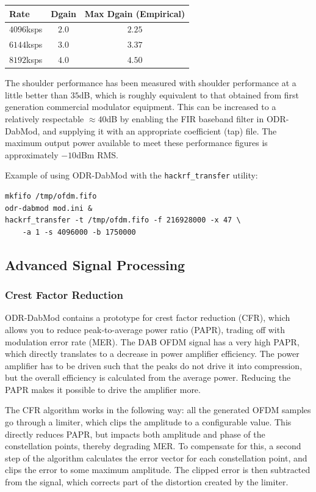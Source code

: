 \begin{center}
\begin{tabular}{| l | c | c |}
    \hline
    Rate       & Dgain & Max Dgain (Empirical) \\ \hline \hline
    $4096$ksps & $2.0$ & $2.25$ \\ \hline
    $6144$ksps & $3.0$ & $3.37$ \\ \hline
    $8192$ksps & $4.0$ & $4.50$ \\
    \hline
\end{tabular}
\end{center}

The shoulder performance has been measured with shoulder performance at a little
better than $35$dB, which is roughly equivalent to that obtained from first
generation commercial modulator equipment. This can be increased to a relatively
respectable $\approx 40$dB by enabling the FIR baseband filter in ODR-DabMod,
and supplying it with an appropriate coefficient (tap) file. The maximum output
power available to meet these performance figures is approximately $-10$dBm RMS.

Example of using ODR-DabMod with the \texttt{hackrf\_transfer} utility:

\begin{lstlisting}
mkfifo /tmp/ofdm.fifo
odr-dabmod mod.ini &
hackrf_transfer -t /tmp/ofdm.fifo -f 216928000 -x 47 \
    -a 1 -s 4096000 -b 1750000
\end{lstlisting}


\subsection{Advanced Signal Processing}
\subsubsection{Crest Factor Reduction}
ODR-DabMod contains a prototype for crest factor reduction (CFR), which allows you to
reduce peak-to-average power ratio (PAPR), trading off with modulation error
rate (MER). The DAB OFDM signal has a very high PAPR, which directly translates
to a decrease in power amplifier efficiency. The power amplifier has to be
driven such that the peaks do not drive it into compression, but the overall
efficiency is calculated from the average power.
Reducing the PAPR makes it possible to drive the amplifier more.

The CFR algorithm works in the following way: all the generated OFDM samples go
through a limiter, which clips the amplitude to a configurable value. This
directly reduces PAPR, but impacts both amplitude and phase of the constellation
points, thereby degrading MER. To compensate for this, a second step of the
algorithm calculates the error vector for each constellation point, and clips
the error to some maximum amplitude. The clipped error is then subtracted from
the signal, which corrects part of the distortion created by the limiter.

